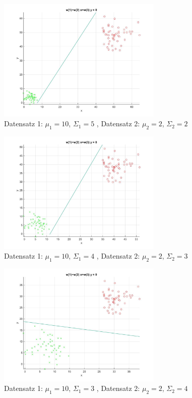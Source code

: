 \documentclass[]{report}
\begin{document}
\begin{figure}[p]
\includegraphics[width=0.7\textwidth]{./images/MyPerceptron_1.jpg}
\caption{Datensatz 1: $\mu_1=10$, $\Sigma_1=5$ , Datensatz 2: $\mu_2=2$, $\Sigma_2=2$}
\end{figure}

\begin{figure}[p]
\includegraphics[width=0.7\textwidth]{./images/MyPerceptron_2.jpg}
\caption{Datensatz 1: $\mu_1=10$, $\Sigma_1=4$ , Datensatz 2: $\mu_2=2$, $\Sigma_2=3$}
\end{figure}

\begin{figure}[p]
\includegraphics[width=0.7\textwidth]{./images/MyPerceptron_3.jpg}
\caption{Datensatz 1: $\mu_1=10$, $\Sigma_1=3$ , Datensatz 2: $\mu_2=2$, $\Sigma_2=4$}
\end{figure}
\end{document}
